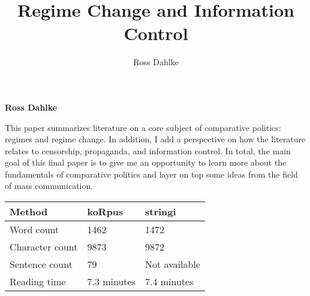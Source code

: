 \documentclass[12pt,]{article}
\title{Regime Change and Information Control  }
\author{\Large Ross Dahlke\vspace{0.05in} \newline\normalsize\emph{}  }
\date{}
\newcommand*{\authorfont}{\fontfamily{phv}\selectfont}
\renewenvironment{abstract}
 {{%
    \setlength{\leftmargin}{0mm}
    \setlength{\rightmargin}{\leftmargin}%
  }%
  \relax}
 {\endlist}
\begin{document}
	
%

{%
\setlength{\parindent}{0pt}
\thispagestyle{plain}
{\fontsize{18}{20}\selectfont\raggedright 
\maketitle  %

}

{
   \vskip 13.5pt\relax \normalsize\fontsize{11}{12} 
\textbf{\authorfont Ross Dahlke} \hskip 15pt \emph{\small }   

}

}








\begin{abstract}

    \hbox{\vrule height .2pt width 39.14pc}

    \vskip 8.5pt %

\noindent This paper summarizes literature on a core subject of comparative
politics: regimes and regime change. In addition, I add a perspective on
how the literature relates to censorship, propaganda, and information
control. In total, the main goal of this final paper is to give me an
opportunity to learn more about the fundamentals of comparative politics
and layer on top some ideas from the field of mass communication.


    \hbox{\vrule height .2pt width 39.14pc}


\end{abstract}


\vskip -8.5pt



\noindent \doublespacing 

\begin{longtable}[]{@{}lll@{}}
\toprule
Method & koRpus & stringi\tabularnewline
\midrule
\endhead
Word count & 1462 & 1472\tabularnewline
Character count & 9873 & 9872\tabularnewline
Sentence count & 79 & Not available\tabularnewline
Reading time & 7.3 minutes & 7.4 minutes\tabularnewline
\bottomrule
\end{longtable}
\end{document}
